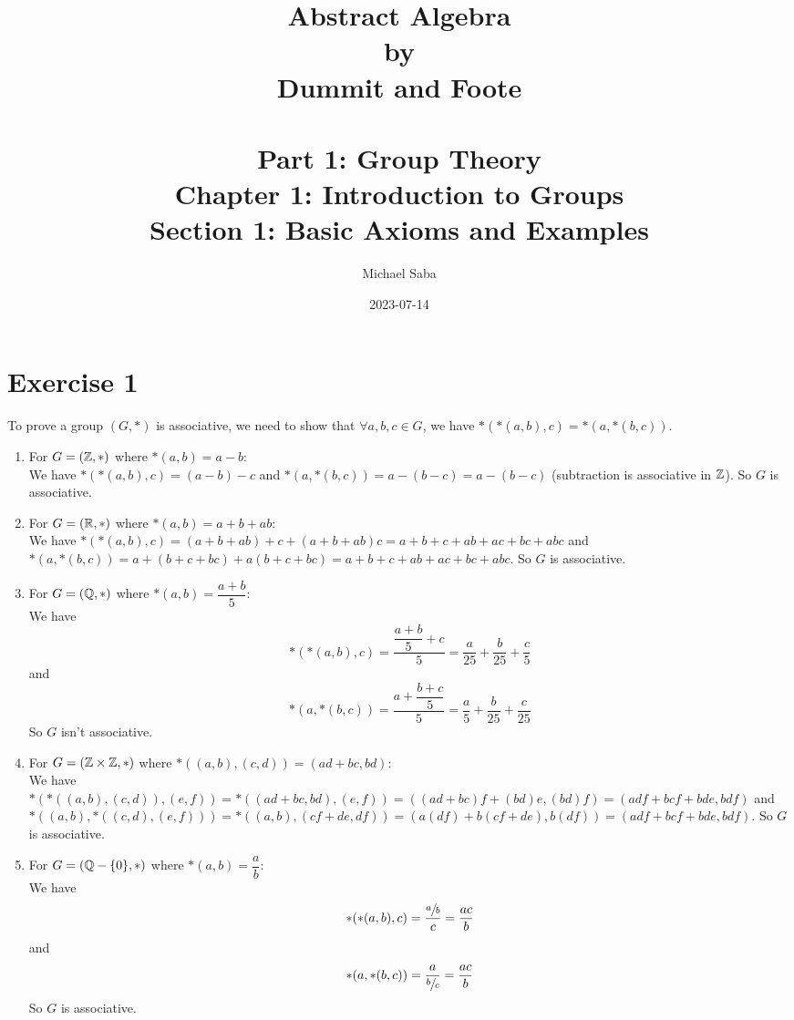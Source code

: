 \documentclass[12pt]{article}
\title{%
    \Huge Abstract Algebra \\
    \large by \\
    \Large Dummit and Foote \\~\\
    \huge Part 1: Group Theory \\
    \LARGE Chapter 1: Introduction to Groups \\
    \Large Section 1: Basic Axioms and Examples
}
\date{2023-07-14}
\author{Michael Saba}
\begin{document}
    \maketitle
    \newpage
    \setlength{\parindent}{0pt}


    \section*{Exercise 1}
    To prove a group $(G, \ast)$ is associative,
    we need to show that $ \forall a, b, c \in G$,
    we have $\ast(\ast(a, b), c) = \ast(a, \ast(b, c))$.
    \begin{enumerate}[label=\textbf{\alph*.}]
        \item
            For $G = (\mathbb{Z}, \ast)$ where $\ast(a, b) = a - b$: \\
            We have $\ast(\ast(a, b), c) = (a - b) - c$
            and $\ast(a, \ast(b, c)) = a - (b - c) = a - (b - c)$
            (subtraction is associative in $\mathbb{Z}$).
            So $G$ is associative. 
        \item
            For $G = (\mathbb{R}, \ast)$ where $\ast(a, b) = a + b + ab$: \\
            We have $\ast(\ast(a, b), c)
            = (a + b + ab) + c + (a + b + ab)c
            = a + b + c + ab + ac + bc + abc$
            and $\ast(a, \ast(b, c))
            = a + (b + c + bc) + a(b + c + bc)
            = a + b + c + ab + ac + bc + abc$.
            So $G$ is associative.
        \item
            For $G = (\mathbb{Q}, \ast)$ where $\ast(a, b) = \dfrac{a+b}{5}$: \\
            We have \[\ast(\ast(a, b), c)
            = \dfrac{\dfrac{a + b}{5} + c}{5}
            = \dfrac{a}{25} + \dfrac{b}{25} + \dfrac{c}{5}\]
            and \[\ast(a, \ast(b, c))
            = \dfrac{a + \dfrac{b + c}{5}}{5}
            = \dfrac{a}{5} + \dfrac{b}{25} + \dfrac{c}{25}\]
            So $G$ isn't associative.
        \item
            For $G = (\mathbb{Z} \times \mathbb{Z}, \ast)$
            where $\ast((a, b), (c, d)) = (ad + bc, bd)$: \\
            We have $\ast(\ast((a, b), (c, d)), (e, f)) 
            = \ast((ad + bc, bd), (e, f)) 
            = ((ad + bc)f + (bd)e, (bd)f) = (adf + bcf + bde, bdf)$
            and $\ast((a, b), \ast((c, d), (e, f)))
            = \ast((a, b), (cf + de, df)) 
            = (a(df) + b(cf + de), b(df)) 
            = (adf + bcf + bde, bdf)$.
            So $G$ is associative.
        \item
            For $G = (\mathbb{Q} - \{0\}, \ast)$ where $\ast(a, b) = \dfrac{a}{b}$: \\
            We have \[\ast(\ast(a, b), c)
            = \dfrac{\sfrac{a}{b}}{c} = \dfrac{ac}{b}\]
            and \[\ast(a, \ast(b, c))
            = \dfrac{a}{\sfrac{b}{c}} = \dfrac{ac}{b}\]
            So $G$ is associative.
    \end{enumerate}
   
\end{document}
